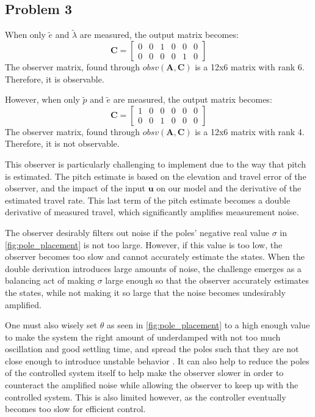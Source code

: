 \subsection{Problem 3}
When only $\tilde{e}$ and $\tilde{\lambda}$ are measured, the output
matrix becomes:
%
\begin{equation*}
  \bm{C} =
  \begin{bmatrix}
    0 & 0 & 1 & 0 & 0 & 0 \\
    0 & 0 & 0 & 0 & 1 & 0
  \end{bmatrix}
\end{equation*}
%
The observer matrix, found through $obsv(\bm{A},\bm{C})$ is a 12x6
matrix with rank 6. Therefore, it is observable.

However, when only $\tilde{p}$ and $\tilde{e}$ are measured, the
output matrix becomes:
%
\begin{equation*}
  \bm{C} =
  \begin{bmatrix}
    1 & 0 & 0 & 0 & 0 & 0 \\
    0 & 0 & 1 & 0 & 0 & 0
  \end{bmatrix}
\end{equation*}
%
The observer matrix, found through $obsv(\bm{A},\bm{C})$ is a 12x6
matrix with rank 4. Therefore, it is not observable.

This observer is particularly challenging to implement due to the way that pitch is estimated.  The pitch estimate is based on the elevation and travel error of the observer, and the impact of the input $\bm{u}$ on our model and the derivative of the estimated travel rate.  This last term of the pitch estimate becomes a double derivative of measured travel, which significantly amplifies measurement noise.

The observer desirably filters out noise if the poles' negative real value $\sigma$ in \cref{fig:pole_placement} is not too large. However, if this value is too low, the observer becomes too slow and cannot accurately estimate the states. When the double derivation introduces large amounts of noise, the challenge emerges as a balancing act of making $\sigma$ large enough so that the observer accurately estimates the states, while not making it so large that the noise becomes undesirably amplified.

One must also wisely set $\theta$ as seen in \cref{fig:pole_placement} to a high enough value to make the system the right amount of underdamped with not too much oscillation and good settling time, and spread the poles such that they are not close enough to introduce unstable behavior \cite[p.290]{chen14}. It can also help to reduce the poles of the controlled system itself to help make the observer slower in order to counteract the amplified noise while allowing the observer to keep up with the controlled system. This is also limited however, as the controller eventually becomes too slow for efficient control.

